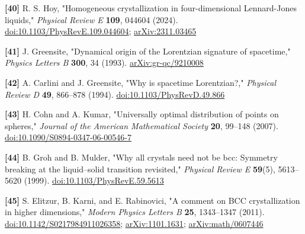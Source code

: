 \documentclass[a4paper,11pt]{article}
\begin{document}
\label{ref40}
\noindent \textbf{[40]} R. S. Hoy, "Homogeneous crystallization in four-dimensional Lennard-Jones liquids," \textit{Physical Review E} \textbf{109}, 044604 (2024). \href{https://doi.org/10.1103/PhysRevE.109.044604}{doi:10.1103/PhysRevE.109.044604}; \href{https://arxiv.org/abs/2311.03465}{arXiv:2311.03465}


\label{ref41}
\noindent \textbf{[41]} J. Greensite, "Dynamical origin of the Lorentzian signature of spacetime," \textit{Physics Letters B} \textbf{300}, 34 (1993). \href{https://arxiv.org/abs/gr-qc/9210008}{arXiv:gr-qc/9210008}


\label{ref42}
\noindent \textbf{[42]} A. Carlini and J. Greensite, "Why is spacetime Lorentzian?," \textit{Physical Review D} \textbf{49}, 866–878 (1994). \href{https://doi.org/10.1103/PhysRevD.49.866}{doi:10.1103/PhysRevD.49.866}


\label{ref43}
\noindent \textbf{[43]} H. Cohn and A. Kumar, "Universally optimal distribution of points on spheres," \textit{Journal of the American Mathematical Society} \textbf{20}, 99–148 (2007). \href{https://doi.org/10.1090/S0894-0347-06-00546-7}{doi:10.1090/S0894-0347-06-00546-7}


\label{ref44}
\noindent \textbf{[44]} B. Groh and B. Mulder, "Why all crystals need not be bcc: Symmetry breaking at the liquid–solid transition revisited," \textit{Physical Review E} \textbf{59}(5), 5613–5620 (1999). \href{https://doi.org/10.1103/PhysRevE.59.5613}{doi:10.1103/PhysRevE.59.5613}


\label{ref45}
\noindent \textbf{[45]} S. Elitzur, B. Karni, and E. Rabinovici, "A comment on BCC crystallization in higher dimensions," \textit{Modern Physics Letters B} \textbf{25}, 1343–1347 (2011). \href{https://doi.org/10.1142/S0217984911026358}{doi:10.1142/S0217984911026358}; \href{https://arxiv.org/abs/1101.1631}{arXiv:1101.1631}; \href{https://arxiv.org/abs/math/0607446}{arXiv:math/0607446}
\end{document}
